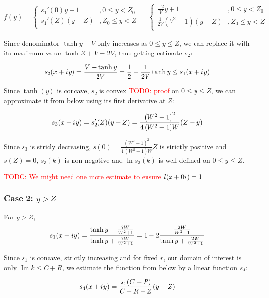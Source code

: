 \documentclass[12pt, a4paper]{article}
\newcommand{\iu}{{i\mkern1mu}}
\renewcommand{\Im}{\operatorname{Im}}
\newcommand{\todo}[1]{{\large \textcolor{red}{TODO: #1}}}
\begin{document}
\[
f(y) = 
\begin{cases}
s_1'(0) y + 1   &, 0 \le y < Z_0  \\
s_1'(Z) (y - Z) &, Z_0 \le y < Z \\
\end{cases}
=
\begin{cases}
\frac{-2}{V} y + 1   &, 0 \le y < Z_0  \\
\frac{1}{2 V}(V^2 - 1) (y - Z) &, Z_0 \le y < Z \\
\end{cases}
\]


Since denominator $\tanh y + V$ only increases as $0 \le y \le Z$, we can replace it with its maximum value $\tanh Z + V = 2 V$, thus getting estimate $s_2$:

\[
s_2(x + \iu y) = \frac{V - \tanh y}{2 V} = \frac{1}{2} - \frac{1}{2 V} \tanh y \le s_1(x + \iu y)
\]

Since $\tanh(y)$ is concave, $s_2$ is convex \todo{proof} on $0 \le y \le Z$, we can approximate it from below using its first derivative at $Z$:

\[
s_3(x + \iu y) = s_2'(Z)(y - Z) = \frac{{\left(W^{2} - 1\right)}^{2}}{4 \, {\left(W^{2} + 1\right)} W} (Z - y)
\]

Since $s_3$ is stricly decreasing, $s(0) = \frac{{\left(W^{2} - 1\right)}^{2}}{4 \, {\left(W^{2} + 1\right)} W} Z$ is strictly positive and $s(Z) = 0$, $s_3(k)$ is non-negative and $\ln s_3(k)$ is well defined on $0 \le y \le Z$.

\todo{We might need one more estimate to ensure $l(x + 0 \iu) = 1$}


\subsubsection*{Case 2: $y > Z$}
For $y > Z$, 
\[
s_1(x + \iu y) 
 = \frac{\tanh y - \frac{2 W}{W^2 + 1}}{\tanh y + \frac{2 W}{W^2 + 1}}
 = 1 - 2 \frac{\frac{2 W}{W^2 + 1}}{\tanh y + \frac{2 W}{W^2 + 1}}
\]

Since $s_1$ is concave, strictly increasing and for fixed $r$, our domain of interest is only $\Im k \le C + R$, we estimate the function from below by a linear function $s_4$:

\[
s_4(x + \iu y) = 
\frac{s_1(C + R)}{C + R - Z} (y - Z)
\]
\end{document}

